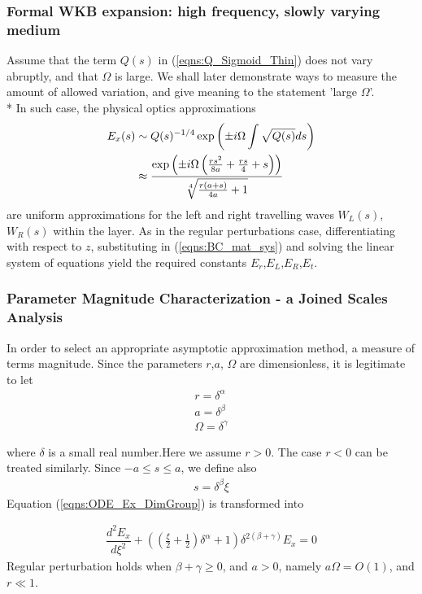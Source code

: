 \documentclass[twocolumn,secnumarabic,amssymb, nobibnotes, aps, prd]{revtex4-1}
\begin{document}
\subsubsection{Formal WKB expansion: high frequency, slowly varying medium}
Assume that the term $Q(s)$ in (\ref{eqns:Q_Sigmoid_Thin}) does not vary abruptly, and that $\Omega$ is large. We shall later demonstrate ways to measure the amount of allowed variation, and give meaning to the statement 'large $\Omega$'. \\*
In such case, the physical optics approximations 
\begin{align}
E_x(s) &\sim Q(s)^{-1/4}\exp \left( \pm i \Omega \int \sqrt{Q(s)}ds\right) \notag \\
& \approx \dfrac{\exp \left(\pm i \Omega  \left(\frac{r s^2}{8 a}+\frac{r s}{4}+s\right) \right)}{\sqrt[4]{\frac{r (a+s)}{4 a}+1}}
\end{align}
are uniform approximations for the left and right travelling waves $W_L(s)$, $W_R(s)$ within the layer. As in the regular perturbations case, differentiating with respect to $z$, substituting in (\ref{eqns:BC_mat_sys}) and solving the linear system of equations yield the required constants $E_r$,$E_L$,$E_R$,$E_t$.   


\subsubsection{Parameter Magnitude Characterization - a Joined Scales Analysis }


In order to select an appropriate asymptotic  approximation method, a measure of terms magnitude. Since the parameters $r$,$a$, $\Omega$ are dimensionless, it is legitimate to let 
\begin{subequations}
\begin{align}
r = \delta^\alpha \\
a = \delta^\beta \\
\Omega = \delta^\gamma
\end{align}
\end{subequations}

where $\delta$ is a small real number.Here we assume $r>0$. The case $r<0$ can be treated similarly.
Since $-a \leq s \leq a$, we define also
\begin{align}
s = \delta^\beta \xi
\end{align}
Equation (\ref{eqns:ODE_Ex_DimGroup}) is transformed into

\begin{align}
\dfrac{d^2 E_x}{d \xi^2}+ \left(\left(\frac{\xi }{2}+\frac{1}{2}\right) \delta ^{\alpha
   }+1\right) \delta ^{2 (\beta +\gamma )}E_x=0
\end{align}
Regular perturbation holds when $\beta+\gamma \geq 0$, and  $a>0$, namely $a \Omega =O(1)$, and $r \ll 1$.\\
\end{document}
